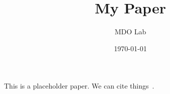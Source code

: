 \documentclass{article}
\title{My Paper}
\date{\today}
\author{MDO Lab}
\begin{document}
\maketitle

This is a placeholder paper.
We can cite things~\cite{Martins2021}.


\end{document}
